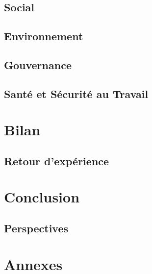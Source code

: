 \documentclass[11pt, oneside, a4paper, titlepage]{report}
\begin{document}
\section{Social}%
\label{sec:rse-social}

\section{Environnement}%
\label{sec:rse-env}

\section{Gouvernance}%
\label{sec:rse-gouv}

\section{Santé et Sécurité au Travail}%
\label{sec:rse-sst}

\chapter{Bilan}%
\label{cha:bilan}

\section{Retour d'expérience}%
\label{sec:bilan-retexp}

\chapter{Conclusion}%
\label{cha:conclu}

\section{Perspectives}%
\label{sec:conclu-persp}

\chapter{Annexes}%
\label{cha:annexes}

\printbibliography[title={Références}]

\listoffigures

\glsaddall{}
\printglossary[type=main, title=Glossaire, toctitle=Glossaire]
\printglossary[type=\acronymtype]
\end{document}
